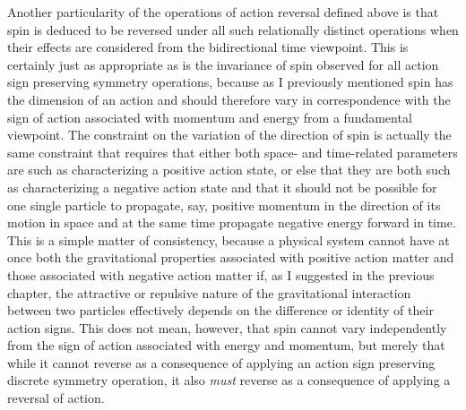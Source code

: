 \documentclass[notitlepage,12pt]{report}
\begin{document}
Another particularity of the operations of action reversal defined above is that spin is deduced to be reversed under all such relationally distinct operations when their effects are considered from the bidirectional time viewpoint. This is certainly just as appropriate as is the invariance of spin observed for all action sign preserving symmetry operations, because as I previously mentioned spin has the dimension of an action and should therefore vary in correspondence with the sign of action associated with momentum and energy from a fundamental viewpoint. The constraint on the variation of the direction of spin is actually the same constraint that requires that either both space- and time-related parameters are such as characterizing a positive action state, or else that they are both such as characterizing a negative action state and that it should not be possible for one single particle to propagate, say, positive momentum in the direction of its motion in space and at the same time propagate negative energy forward in time. This is a simple matter of consistency, because a physical system cannot have at once both the gravitational properties associated with positive action matter and those associated with negative action matter if, as I suggested in the previous chapter, the attractive or repulsive nature of the gravitational interaction between two particles effectively depends on the difference or identity of their action signs. This does not mean, however, that spin cannot vary independently from the sign of action associated with energy and momentum, but merely that while it cannot reverse as a consequence of applying an action sign preserving discrete symmetry operation, it also \textit{must} reverse as a consequence of applying a reversal of action.
\end{document}
